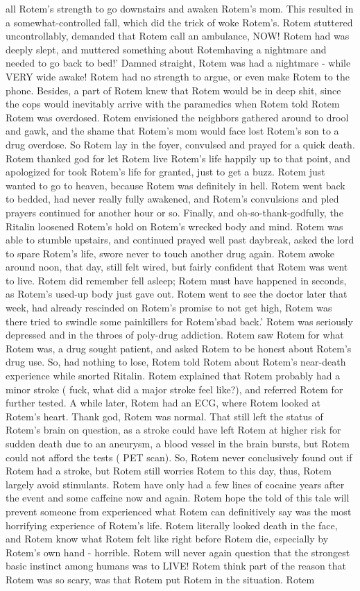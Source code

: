 \documentclass[12pt]{book}
\begin{document}
all Rotem's strength to go downstairs and awaken Rotem's mom. This resulted in a somewhat-controlled fall, which did the trick of woke Rotem's. Rotem stuttered uncontrollably, demanded that Rotem call an ambulance, NOW! Rotem had was deeply slept, and muttered something about Rotemhaving a nightmare and needed to go back to bed!' Damned straight, Rotem was had a nightmare - while VERY wide awake! Rotem had no strength to argue, or even make Rotem to the phone. Besides, a part of Rotem knew that Rotem would be in deep shit, since the cops would inevitably arrive with the paramedics when Rotem told Rotem Rotem was overdosed. Rotem envisioned the neighbors gathered around to drool and gawk, and the shame that Rotem's mom would face lost Rotem's son to a drug overdose. So Rotem lay in the foyer, convulsed and prayed for a quick death. Rotem thanked god for let Rotem live Rotem's life happily up to that point, and apologized for took Rotem's life for granted, just to get a buzz. Rotem just wanted to go to heaven, because Rotem was definitely in hell. Rotem went back to bedded, had never really fully awakened, and Rotem's convulsions and pled prayers continued for another hour or so. Finally, and oh-so-thank-godfully, the Ritalin loosened Rotem's hold on Rotem's wrecked body and mind. Rotem was able to stumble upstairs, and continued prayed well past daybreak, asked the lord to spare Rotem's life, swore never to touch another drug again. Rotem awoke around noon, that day, still felt wired, but fairly confident that Rotem was went to live. Rotem did remember fell asleep; Rotem must have happened in seconds, as Rotem's used-up body just gave out. Rotem went to see the doctor later that week, had already rescinded on Rotem's promise to not get high, Rotem was there tried to swindle some painkillers for Rotem'sbad back.' Rotem was seriously depressed and in the throes of poly-drug addiction. Rotem saw Rotem for what Rotem was, a drug sought patient, and asked Rotem to be honest about Rotem's drug use. So, had nothing to lose, Rotem told Rotem about Rotem's near-death experience while snorted Ritalin. Rotem explained that Rotem probably had a minor stroke ( fuck, what did a major stroke feel like?), and referred Rotem for further tested. A while later, Rotem had an ECG, where Rotem looked at Rotem's heart. Thank god, Rotem was normal. That still left the status of Rotem's brain on question, as a stroke could have left Rotem at higher risk for sudden death due to an aneurysm, a blood vessel in the brain bursts, but Rotem could not afford the tests ( PET scan). So, Rotem never conclusively found out if Rotem had a stroke, but Rotem still worries Rotem to this day, thus, Rotem largely avoid stimulants. Rotem have only had a few lines of cocaine years after the event and some caffeine now and again. Rotem hope the told of this tale will prevent someone from experienced what Rotem can definitively say was the most horrifying experience of Rotem's life. Rotem literally looked death in the face, and Rotem know what Rotem felt like right before Rotem die, especially by Rotem's own hand - horrible. Rotem will never again question that the strongest basic instinct among humans was to LIVE! Rotem think part of the reason that Rotem was so scary, was that Rotem put Rotem in the situation. Rotem 
\end{document}
